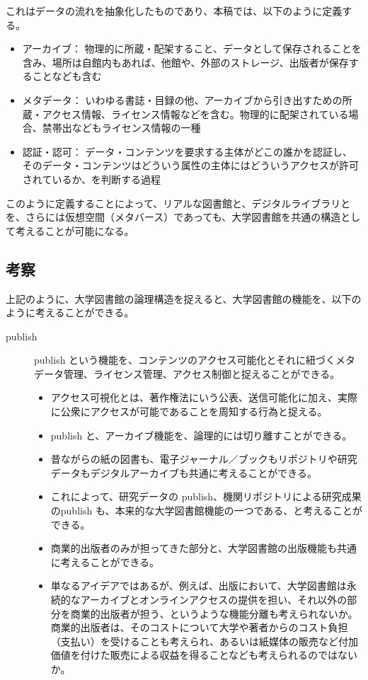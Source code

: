 \documentclass[submit,noauthor]{ono}
\begin{document}
これはデータの流れを抽象化したものであり、本稿では、以下のように定義する。

\begin{itemize}
  \item アーカイブ： 物理的に所蔵・配架すること、データとして保存されることを含み、場所は自館内もあれば、他館や、外部のストレージ、出版者が保存することなども含む
  \item メタデータ： いわゆる書誌・目録の他、アーカイブから引き出すための所蔵・アクセス情報、ライセンス情報などを含む。物理的に配架されている場合、禁帯出などもライセンス情報の一種
  \item 認証・認可： データ・コンテンツを要求する主体がどこの誰かを認証し、そのデータ・コンテンツはどういう属性の主体にはどういうアクセスが許可されているか、を判断する過程
\end{itemize}

このように定義することによって、リアルな図書館と、デジタルライブラリとを、さらには仮想空間（メタバース）であっても、大学図書館を共通の構造として考えることが可能になる。

\subsection{考察}

上記のように、大学図書館の論理構造を捉えると、大学図書館の機能を、以下のように考えることができる。

\begin{description}
  \item[publish] publish という機能を、コンテンツのアクセス可能化とそれに紐づくメタデータ管理、ライセンス管理、アクセス制御と捉えることができる。
  \begin{itemize}
	\item アクセス可視化とは、著作権法にいう公表、送信可能化に加え、実際に公衆にアクセスが可能であることを周知する行為と捉える。
  \item publish と、アーカイブ機能を、論理的には切り離すことができる。
  \item  昔ながらの紙の図書も、電子ジャーナル／ブックもリポジトリや研究データもデジタルアーカイブも共通に考えることができる。
  \item これによって、研究データの publish、機関リポジトリによる研究成果のpublish も、本来的な大学図書館機能の一つである、と考えることができる。
  \item  商業的出版者のみが担ってきた部分と、大学図書館の出版機能も共通に考えることができる。
  \item  単なるアイデアではあるが、例えば、出版において、大学図書館は永続的なアーカイブとオンラインアクセスの提供を担い、それ以外の部分を商業的出版者が担う、というような機能分離も考えられないか。商業的出版者は、そのコストについて大学や著者からのコスト負担（支払い）を受けることも考えられ、あるいは紙媒体の販売など付加価値を付けた販売による収益を得ることなども考えられるのではないか。
\end{itemize}
\end{description}
\end{document}
